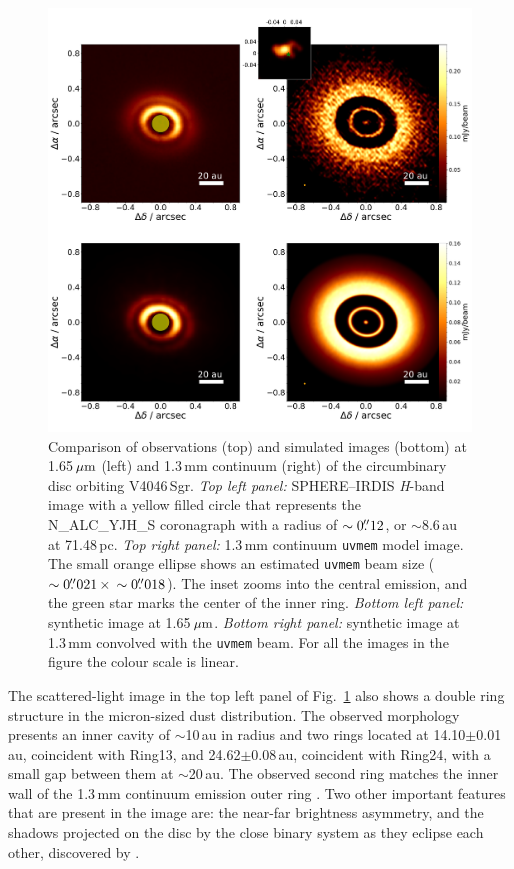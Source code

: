 \documentclass[fleqn,usenatbib,useAMS]{mnras}
\begin{document}
\begin{figure}
  \includegraphics[width=\textwidth]{hot_two_E.pdf}
  \caption{Comparison of observations (top) and simulated images (bottom) at 1.65\,$\hbox{$\mu$m}$ (left) and 1.3\,mm continuum (right) of the circumbinary disc orbiting V4046\,Sgr. \textit{Top left panel:} SPHERE--IRDIS \textit{H}-band image with a yellow filled circle that represents the N\_ALC\_YJH\_S coronagraph with a radius of $\sim0\hbox{$.\!\!^{\prime\prime}$}12$, or $\sim$8.6\,au at 71.48\,pc. \textit{Top right panel:} 1.3\,mm continuum {\tt uvmem} model image. The small orange ellipse shows an estimated {\tt uvmem} beam size ($\sim0\hbox{$.\!\!^{\prime\prime}$}021 \, \times \, \sim0\hbox{$.\!\!^{\prime\prime}$}018$). The inset zooms into the central emission, and the green star marks the center of the inner ring. \textit{Bottom left panel:} synthetic image at 1.65\,$\hbox{$\mu$m}$. \textit{Bottom right panel:} synthetic image at 1.3\,mm convolved with the {\tt uvmem} beam. For all the images in the figure the colour scale is linear.}
  \label{fig:images_vs_simulated}
\end{figure}

The scattered-light image in the top left panel of Fig.~\ref{fig:images_vs_simulated} also shows a double ring structure in the micron-sized dust distribution. The observed morphology presents an inner cavity of $\sim$10\,au in radius and two rings located at 14.10$\pm$0.01\,au, coincident with Ring13, and 24.62$\pm$0.08\,au, coincident with Ring24, with a small gap between them at $\sim$20\,au. The observed second ring matches the inner wall of the 1.3\,mm continuum emission outer ring \citep{Ru_z_Rodr_guez_2019}. Two other important features that are present in the image are: the near-far brightness asymmetry, and the shadows projected on the disc by the close binary system as they eclipse each other, discovered by \citet{dOrazi}.
\end{document}
